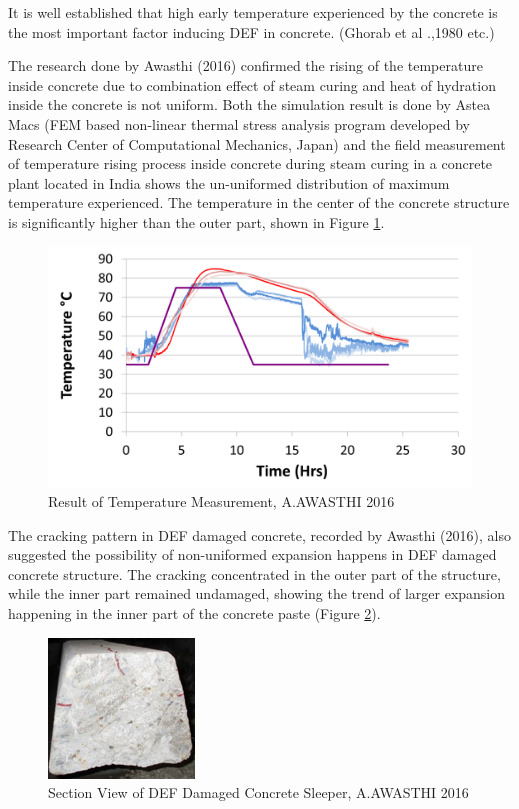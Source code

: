 It is well established that high early temperature experienced by the concrete is the most important factor inducing DEF in concrete. (Ghorab et al .,1980\cite{Ghorab} etc.)

The research done by Awasthi (2016)\cite{Awasthi} confirmed the rising of the temperature inside concrete due to combination effect of steam curing and heat of hydration inside the concrete is not uniform. Both the simulation result is done by Astea Macs (FEM based non-linear thermal stress analysis program developed by Research Center of Computational Mechanics, Japan) and the field measurement of temperature rising process inside concrete during steam curing in a concrete plant located in India shows the un-uniformed distribution of maximum temperature experienced. The temperature in the center of the concrete structure is significantly higher than the outer part, shown in Figure \ref{fig:temp_measurement}.

\begin{figure}[ht!]
\centering
\includegraphics[width=.6\linewidth]{Files/Background/Anupam_2.png}
  \caption{Result of Temperature Measurement, A.AWASTHI 2016}
  \label{fig:temp_measurement}
\end{figure}


The cracking pattern in DEF damaged concrete, recorded by Awasthi (2016)\cite{Awasthi}, also suggested the possibility of non-uniformed expansion happens in DEF damaged concrete structure. The cracking concentrated in the outer part of the structure, while the inner part remained undamaged, showing the trend of larger expansion happening in the inner part of the concrete paste (Figure \ref{fig:section_view}).

\begin{figure}[ht!]
\centering
\includegraphics[width=.4\linewidth]{Files/Background/Anupam_5.png}
  \caption{Section View of DEF Damaged Concrete Sleeper, A.AWASTHI 2016}
  \label{fig:section_view}
\end{figure}

